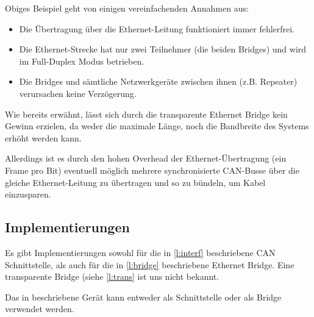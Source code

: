 Obiges Beispiel geht von einigen vereinfachenden Annahmen aus:
\begin{itemize}
        \item Die Übertragung über die Ethernet-Leitung funktioniert immer
                fehlerfrei.
        \item Die Ethernet-Strecke hat nur zwei Teilnehmer (die beiden Bridges) und
                wird im Full-Duplex Modus betrieben.
        \item Die Bridges und sämtliche Netzwerkgeräte zwischen ihnen (z.B. Repeater)
                verursachen keine Verzögerung.
\end{itemize}

Wie bereits erwähnt, lässt sich durch die transparente Ethernet Bridge kein Gewinn
erzielen, da weder die maximale Länge, noch die Bandbreite des Systems erhöht werden
kann.

Allerdings ist es durch den hohen Overhead der Ethernet-Übertragung (ein Frame pro
Bit) eventuell möglich mehrere synchronisierte CAN-Busse über die gleiche
Ethernet-Leitung zu übertragen und so zu bündeln, um Kabel einzusparen.

\subsection{Implementierungen}

Es gibt Implementierungen sowohl für die in \ref{l:interf} beschriebene CAN
Schnittstelle, als auch für die in \ref{l:bridge} beschriebene Ethernet Bridge. Eine
transparente Bridge (siehe \ref{l:trans} ist uns nicht bekannt.

Das in \citep{STE} beschriebene Gerät kann entweder als Schnittstelle oder als Bridge
verwendet werden.

\newpage {} \listoffigures

\newpage {}
% 


